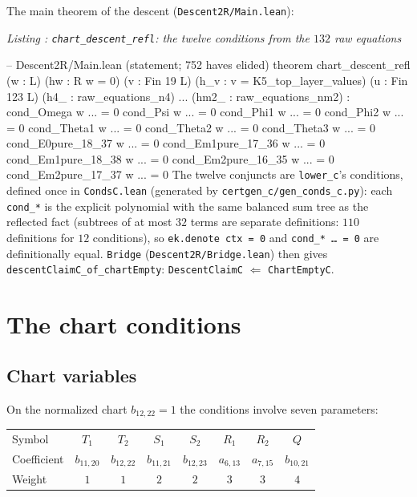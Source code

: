 \documentclass[a4paper,11pt]{article}
\newcounter{leanlisting}
\newenvironment{leanlisting}[2]{%
  \refstepcounter{leanlisting}\label{#2}%
  \begin{center}\textit{\small Listing \theleanlisting: #1}\end{center}%
  \Verbatim[breaklines=true,breakanywhere=true,fontsize=\footnotesize,frame=single,framesep=4pt,rulecolor=\color{gray!50},fillcolor=\color{gray!5}]%
}{%
  \endVerbatim%
}
\theoremstyle{plain}
\theoremstyle{definition}
\theoremstyle{remark}
\begin{document}
The main theorem of the descent (\texttt{Descent2R/Main.lean}):
\begin{leanlisting}{\texttt{chart\_descent\_refl}: the twelve conditions from the $132$ raw equations}{bc:lst:descent}
-- Descent2R/Main.lean (statement; 752 haves elided)
theorem chart_descent_refl
  (w : L) (hw : R w = 0)
  (v : Fin 19 \to L) (h_v : v = K5_top_layer_values)
  (u : Fin 123 \to L)
  (h4_ : raw_equations_n4) ... (hm2_ : raw_equations_nm2) :
  cond_Omega w ... = 0 \land cond_Psi w ... = 0 \land
  cond_Phi1 w ... = 0 \land cond_Phi2 w ... = 0 \land
  cond_Theta1 w ... = 0 \land cond_Theta2 w ... = 0 \land cond_Theta3 w ... = 0 \land
  cond_E0pure_18_37 w ... = 0 \land cond_Em1pure_17_36 w ... = 0 \land
  cond_Em1pure_18_38 w ... = 0 \land cond_Em2pure_16_35 w ... = 0 \land
  cond_Em2pure_17_37 w ... = 0
\end{leanlisting}
The twelve conjuncts are \texttt{lower\_c}'s conditions, defined once in \texttt{CondsC.lean} (generated by \texttt{certgen\_c/}\linebreak\texttt{gen\_conds\_c.py}): each \texttt{cond\_*} is the explicit polynomial with the same balanced sum tree as the reflected fact (subtrees of at most $32$ terms are separate definitions: $110$ definitions for $12$ conditions), so \texttt{ek.denote ctx = 0} and \texttt{cond\_* \dots\ = 0} are definitionally equal. \texttt{Bridge} (\texttt{Descent2R/Bridge.lean}) then gives \texttt{descentClaimC\_of\_chartEmpty}: \texttt{DescentClaimC} $\Leftarrow$ \texttt{ChartEmptyC}.

\section{The chart conditions}\label{bc:sec:conditions}

\subsection{Chart variables}

On the normalized chart $b_{12,22}=1$ the conditions involve seven parameters:

\begin{center}
\begin{tabular}{lccccccc}
\toprule
Symbol & $T_1$ & $T_2$ & $S_1$ & $S_2$ & $R_1$ & $R_2$ & $Q$ \\
Coefficient & $b_{11,20}$ & $b_{12,22}$ & $b_{11,21}$ & $b_{12,23}$ & $a_{6,13}$ & $a_{7,15}$ & $b_{10,21}$ \\
Weight & $1$ & $1$ & $2$ & $2$ & $3$ & $3$ & $4$ \\
\bottomrule
\end{tabular}
\end{center}
\end{document}
